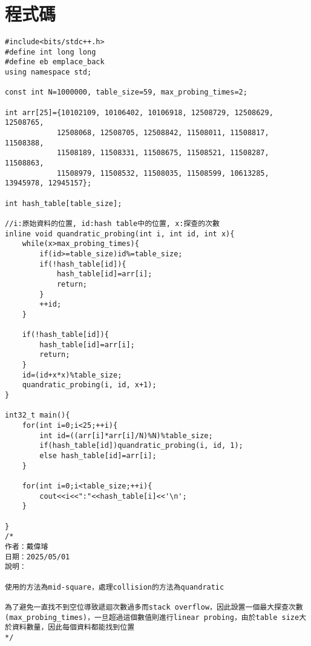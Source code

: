\documentclass[12pt,a4paper]{article}
\begin{document}
\section*{程式碼}
\begin{lstlisting}
#include<bits/stdc++.h>
#define int long long
#define eb emplace_back
using namespace std;

const int N=1000000, table_size=59, max_probing_times=2;

int arr[25]={10102109, 10106402, 10106918, 12508729, 12508629, 12508765,
            12508068, 12508705, 12508842, 11508011, 11508817, 11508388,
            11508189, 11508331, 11508675, 11508521, 11508287, 11508863,
            11508979, 11508532, 11508035, 11508599, 10613285, 13945978, 12945157};

int hash_table[table_size];

//i:原始資料的位置, id:hash table中的位置, x:探查的次數
inline void quandratic_probing(int i, int id, int x){
    while(x>max_probing_times){
        if(id>=table_size)id%=table_size;
        if(!hash_table[id]){
            hash_table[id]=arr[i];
            return;
        }
        ++id;
    }

    if(!hash_table[id]){
        hash_table[id]=arr[i];
        return;
    }
    id=(id+x*x)%table_size;
    quandratic_probing(i, id, x+1);
}

int32_t main(){
    for(int i=0;i<25;++i){
        int id=((arr[i]*arr[i]/N)%N)%table_size;
        if(hash_table[id])quandratic_probing(i, id, 1);
        else hash_table[id]=arr[i];
    }

    for(int i=0;i<table_size;++i){
        cout<<i<<":"<<hash_table[i]<<'\n';
    }

}
/*
作者：戴偉璿
日期：2025/05/01
說明：

使用的方法為mid-square，處理collision的方法為quandratic

為了避免一直找不到空位導致遞迴次數過多而stack overflow，因此設置一個最大探查次數(max_probing_times)，一旦超過這個數值則進行linear probing，由於table size大於資料數量，因此每個資料都能找到位置
*/
\end{lstlisting}
\end{document}
